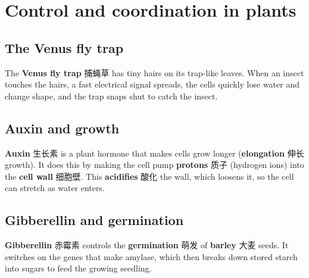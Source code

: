 \documentclass[11pt]{article}
\begin{document}
\section*{Control and coordination in plants}

\subsection*{The Venus fly trap}

The \textbf{Venus fly trap} 捕蝇草 has tiny hairs on its trap-like leaves. When an insect touches the hairs, a fast electrical signal spreads, the cells quickly lose water and change shape, and the trap snaps shut to catch the insect.

\subsection*{Auxin and growth}

\textbf{Auxin} 生长素 is a plant hormone that makes cells grow longer (\textbf{elongation} 伸长 growth). It does this by making the cell pump \textbf{protons} 质子 (hydrogen ions) into the \textbf{cell wall} 细胞壁. This \textbf{acidifies} 酸化 the wall, which loosens it, so the cell can stretch as water enters.

\subsection*{Gibberellin and germination}

\textbf{Gibberellin} 赤霉素 controls the \textbf{germination} 萌发 of \textbf{barley} 大麦 seeds. It switches on the genes that make amylase, which then breaks down stored starch into sugars to feed the growing seedling.
\end{document}
